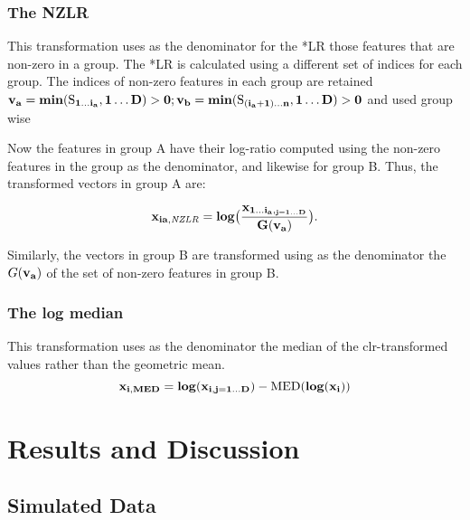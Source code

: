 \documentclass{bmcart}
\begin{document}
\subsubsection*{The NZLR}

This transformation uses as the denominator for the *LR those features that are non-zero in a group. The *LR is calculated using a different set of indices for each group. The indices of non-zero features in each group are retained $\bf{v}_a = min(\mathrm{S}_{1 \ldots i_a}, 1 \ldots D) > 0;\bf{v}_b = min(\mathrm{S}_{(i_a+1) \ldots n}, 1 \ldots D) > 0 $ and used group wise

Now the features in group A have their log-ratio computed using the non-zero features in the group as the denominator, and likewise for group B. Thus, the transformed vectors in group A are:

\begin{equation}
\bf{x}_{ia, \mathit{NZLR}} = log \big( \frac{x_{1 \ldots i_a,_{j=1 \dots D}}}{G(\mathit{\bf{v}_a})} \big).\label{eq:iqlr}
\end{equation}

Similarly, the vectors in group B are transformed using as the denominator the $G(\mathit{\bf{v}_a})$ of the set of non-zero features in group B. 


\subsubsection*{The log median}

This transformation uses as the denominator the median of the clr-transformed values rather than the geometric mean. 
\begin{equation}
\bf{x}_{i,MED} = log({x_{i,j=1 \dots D}}) - \mathrm{MED}(log(x_i))
\label{eq:iqlr}
\end{equation}


\section*{Results and Discussion}

\subsection*{Simulated Data}
\end{document}
